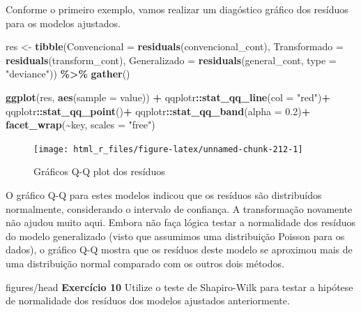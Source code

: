 \documentclass[
]{book}
\newenvironment{Shaded}{\begin{snugshade}}{\end{snugshade}}
\newcommand{\DataTypeTok}[1]{\textcolor[rgb]{0.13,0.29,0.53}{#1}}
\newcommand{\FloatTok}[1]{\textcolor[rgb]{0.00,0.00,0.81}{#1}}
\newcommand{\KeywordTok}[1]{\textcolor[rgb]{0.13,0.29,0.53}{\textbf{#1}}}
\newcommand{\NormalTok}[1]{#1}
\newcommand{\OperatorTok}[1]{\textcolor[rgb]{0.81,0.36,0.00}{\textbf{#1}}}
\newcommand{\StringTok}[1]{\textcolor[rgb]{0.31,0.60,0.02}{#1}}
\numberwithin{equation}{section}
\newcommand{\indt}[1]{\index{#1|ST}}
\newenvironment{tarefa}
  {\begin{customBlockImage}[colframe=customOrange, title=Tarefa de casa]{figures/head}}
  {\end{customBlockImage}}
\begin{document}
Conforme o primeiro exemplo, vamos realizar um diagóstico gráfico dos resíduos para os modelos ajustados.

\begin{Shaded}
\begin{Highlighting}[]
\NormalTok{res \textless{}{-}}\StringTok{ }\KeywordTok{tibble}\NormalTok{(}\DataTypeTok{Convencional =} \KeywordTok{residuals}\NormalTok{(convencional\_cont),}
              \DataTypeTok{Transformado =} \KeywordTok{residuals}\NormalTok{(transform\_cont),}
              \DataTypeTok{Generalizado =} \KeywordTok{residuals}\NormalTok{(general\_cont, }\DataTypeTok{type =} \StringTok{"deviance"}\NormalTok{)) }\OperatorTok{\%\textgreater{}\%}
\StringTok{       }\KeywordTok{gather}\NormalTok{()}

\KeywordTok{ggplot}\NormalTok{(res, }\KeywordTok{aes}\NormalTok{(}\DataTypeTok{sample =}\NormalTok{ value)) }\OperatorTok{+}
\StringTok{       }\NormalTok{qqplotr}\OperatorTok{::}\KeywordTok{stat\_qq\_line}\NormalTok{(}\DataTypeTok{col =} \StringTok{"red"}\NormalTok{)}\OperatorTok{+}
\StringTok{       }\NormalTok{qqplotr}\OperatorTok{::}\KeywordTok{stat\_qq\_point}\NormalTok{()}\OperatorTok{+}
\StringTok{       }\NormalTok{qqplotr}\OperatorTok{::}\KeywordTok{stat\_qq\_band}\NormalTok{(}\DataTypeTok{alpha =} \FloatTok{0.2}\NormalTok{)}\OperatorTok{+}
\StringTok{       }\KeywordTok{facet\_wrap}\NormalTok{(}\OperatorTok{\textasciitilde{}}\NormalTok{key, }\DataTypeTok{scales =} \StringTok{"free"}\NormalTok{)}
\end{Highlighting}
\end{Shaded}

\begin{figure}

{\centering \texttt{[image: html\_r\_files/figure-latex/unnamed-chunk-212-1]} 

}

\caption{Gráficos Q-Q plot dos resíduos }\label{fig:unnamed-chunk-212}
\end{figure}

O gráfico Q-Q para estes modelos indicou que os resíduos são distribuídos normalmente, considerando o intervalo de confiança. A transformação novamente não ajudou muito aqui. Embora não faça lógica testar a normalidade dos resíduos do modelo generalizado (visto que assumimos uma distribuição Poisson para os dados), o gráfico Q-Q mostra que os resíduos deste modelo se aproximou mais de uma distribuição normal comparado com os outros dois métodos.

\indt{Exercícios}
\begin{tarefa}
\textbf{Exercício 10}
Utilize o teste de Shapiro-Wilk para testar a hipótese de normalidade dos resíduos dos modelos ajustados anteriormente.
\end{tarefa}
\end{document}
